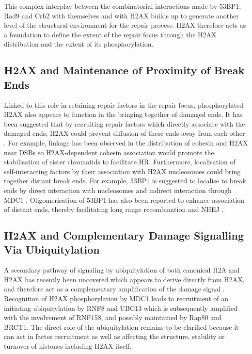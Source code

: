 This complex interplay between the combinatorial interactions made by 53BP1, Rad9 and Crb2 with
themselves and with \textgamma H2AX builds up to generate another level of the structural environment
for the repair process. \textgamma H2AX therefore acts as a foundation to define the extent of the
repair focus through the H2AX distribution and the extent of its phosphorylation.

\subsection{\textgamma H2AX and Maintenance of Proximity of Break Ends}
Linked to this role in retaining repair factors in the repair focus, phosphorylated H2AX also appears
to function in the bringing together of damaged ends. It has been suggested that by recruiting repair
factors which directly associate with the damaged ends, H2AX could prevent diffusion of these ends
away from each other \citep{BA04}. For example, linkage has been observed in the distribution of
cohesin and \textgamma H2AX near DSBs \citep{UAS+04} so \textgamma H2AX-dependent cohesin association would
promote the stabilisation of sister chromatids to facilitate HR\@. Furthermore, localisation of
self-interacting factors by their association with \textgamma H2AX nucleosomes could bring together
distant break ends. For example, 53BP1 is suggested to localise to break ends by direct interaction
with nucleosomes and indirect interaction through MDC1 \citep{HZDJ+04,BLW+06,EAR+09}. Oligomerisation
of 53BP1 has also been reported to enhance association of distant ends, thereby facilitating long
range recombination and NHEJ \citep{DGW+08,DCS+08}.

\subsection{\textgamma H2AX and Complementary Damage Signalling Via Ubiquitylation}
A secondary pathway of signaling by ubiquitylation of both canonical H2A and H2AX has recently been
uncovered which appears to derive directly from \textgamma H2AX, and therefore act as a complementary
amplification of the damage signal \citep{PD09}. Recognition of H2AX phosphorylation by MDC1 leads to
recruitment of an initiating ubiquitylation by RNF8 and UBC13 which is subsequently amplified with
the involvement of RNF158, and possibly maintained by Rap80 and BRCT1\@. The direct role of the
ubiquitylation remains to be clarified because it can act in factor recruitment as well as affecting
the structure, stability or turnover of histones including H2AX itself.

